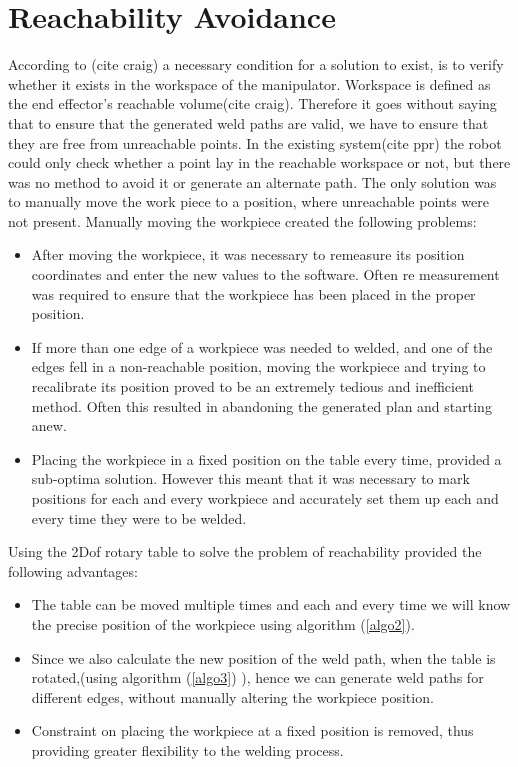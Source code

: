 \section{Reachability Avoidance}
According to (cite craig) a necessary condition for a solution to exist, is to verify whether it exists in the workspace of the manipulator. Workspace is defined as the end effector's reachable volume(cite craig). Therefore it goes without saying that to ensure that the generated weld paths are valid, we have to ensure that they are free from unreachable points. In the existing system(cite ppr) the robot could only check whether a point lay in the reachable workspace or not, but there was no method to avoid it or generate an alternate path. The only solution was to manually move the work piece to a position, where unreachable points were not present. Manually moving the workpiece created the following problems:
\begin{itemize}
	\item After moving the workpiece, it was necessary to remeasure its position coordinates and enter the new values to the software. Often re measurement was required to ensure that the workpiece has been placed in the proper position.
	\item If more than one edge of a workpiece was needed to welded, and one of the edges fell in a non-reachable position, moving the workpiece and trying to recalibrate its position proved to be an extremely tedious and inefficient method. Often this resulted in abandoning the generated plan and starting anew.
	\item Placing the workpiece in a fixed position on the table every time, provided a sub-optima solution. However this meant that it was necessary to mark positions for each and every workpiece and accurately set them up each and every time they were to be welded.	
\end{itemize} 

Using the 2Dof rotary table to solve the problem of reachability provided the following advantages:
\begin{itemize}
	\item The table can be moved multiple times and each and every time we will know the precise position of the workpiece using algorithm (\ref{algo2}).
	\item Since we also calculate the new position of the weld path, when the table is rotated,(using algorithm (\ref{algo3}) ), hence we can generate weld paths for different edges, without manually altering the workpiece position.
	\item Constraint on placing the workpiece at a fixed position is removed, thus providing greater flexibility to the welding process.
\end{itemize}

